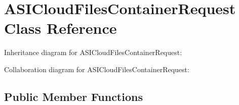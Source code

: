 \hypertarget{interface_a_s_i_cloud_files_container_request}{
\section{\-A\-S\-I\-Cloud\-Files\-Container\-Request \-Class \-Reference}
\label{interface_a_s_i_cloud_files_container_request}
}


\-Inheritance diagram for \-A\-S\-I\-Cloud\-Files\-Container\-Request\-:


\-Collaboration diagram for \-A\-S\-I\-Cloud\-Files\-Container\-Request\-:
\subsection*{\-Public \-Member \-Functions}
